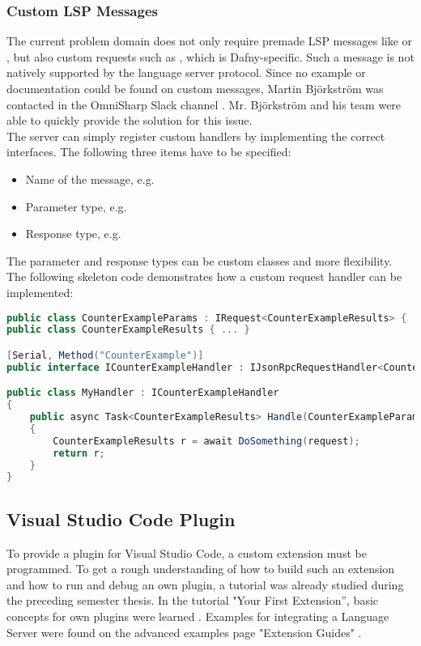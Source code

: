 \subsubsection{Custom LSP Messages}
\label{chapter:customlspmsg}
The current problem domain does not only require premade LSP messages like  or , but also custom requests such as , which is Dafny-specific.
Such a message is not natively supported by the language server protocol.
Since no example or documentation could be found on custom messages, Martin Bj\"orkstr\"om was contacted in the OmniSharp Slack channel \cite{omnisharpslack}.
Mr. Bj\"orkstr\"om and his team were able to quickly provide the solution for this issue.\\

The server can simply register custom handlers by implementing the correct interfaces.
The following three items have to be specified:
\begin{itemize}
    \item Name of the message, e.g. 
    \item Parameter type, e.g. 
    \item Response type, e.g. 
\end{itemize}


The parameter and response types can be custom classes and more flexibility.
The following skeleton code demonstrates how a custom request handler can be implemented:

\begin{lstlisting}[language=csharp, caption={LSP Handler Implementation for CounterExample}, captionpos=b, label={lst:lspcustomhandler}]
public class CounterExampleParams : IRequest<CounterExampleResults> { ... }
public class CounterExampleResults { ... }

[Serial, Method("CounterExample")]
public interface ICounterExampleHandler : IJsonRpcRequestHandler<CounterExampleParams, CounterExampleResults> { }

public class MyHandler : ICounterExampleHandler
{
    public async Task<CounterExampleResults> Handle(CounterExampleParams request, CancellationToken c)
    {
        CounterExampleResults r = await DoSomething(request);
        return r;
    }
}
\end{lstlisting}


\subsection{Visual Studio Code Plugin}
To provide a plugin for Visual Studio Code, a custom extension must be programmed.
To get a rough understanding of how to build such an extension
and how to run and debug an own plugin, a tutorial was already studied during the preceding semester thesis.
In the tutorial "Your First Extension”, basic concepts for own plugins were learned \cite{vscode-first-extension}.
Examples for integrating a Language Server were found on the advanced examples page "Extension Guides" \cite{vscode-extensions}. \\

